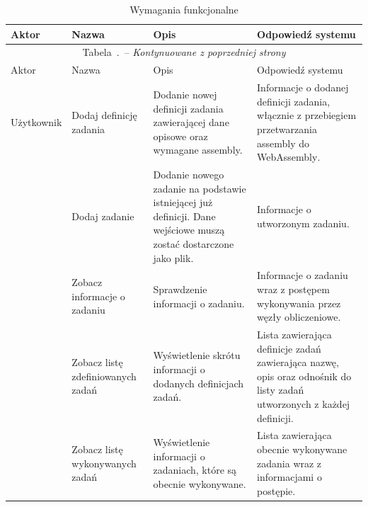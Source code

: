 \documentclass[a4paper,11pt,twoside]{report}
\renewcommand{\tablename}{Tabela}
\renewcommand*{\thetable}{\arabic{chapter}.\arabic{table}}
\theoremstyle{definition}
\begin{document}
            \pagebreak
            \begin{longtable}{| p{} | p{} | p{} | p{} |}
                \caption{Wymagania funkcjonalne}
                \label{wymagania-funkcjonalne} \\
                \hline
                Aktor & Nazwa & Opis & Odpowiedź systemu \\ \hline
                \endfirsthead
                \multicolumn{4}{c}{\tablename\ \thetable\ -- \textit{Kontynuowane z poprzedniej strony}} \\
                \hline
                Aktor & Nazwa & Opis & Odpowiedź systemu \\ \hline
                \endhead
                
                Użytkownik
                & Dodaj definicję zadania
                & Dodanie nowej definicji zadania zawierającej dane opisowe oraz wymagane assembly.
                & Informacje o dodanej definicji zadania, włącznie z przebiegiem przetwarzania assembly do \foreignlanguage{english}{WebAssembly}. \\ \cline{2-4} 
                
                & Dodaj zadanie
                & Dodanie nowego zadanie na podstawie istniejącej już definicji. Dane wejściowe muszą zostać dostarczone jako plik. & Informacje o utworzonym zadaniu. \\ \cline{2-4} 
                
                & Zobacz informacje o zadaniu
                & Sprawdzenie informacji o zadaniu.
                & Informacje o zadaniu wraz z postępem wykonywania przez węzły obliczeniowe. \\ \cline{2-4} 
                & Zobacz listę zdefiniowanych zadań & Wyświetlenie skrótu informacji o dodanych definicjach zadań.                                  & Lista zawierająca definicje zadań zawierająca nazwę, opis oraz odnośnik do listy zadań utworzonych z każdej definicji. \\ \cline{2-4} 
                
                & Zobacz listę wykonywanych zadań   
                & Wyświetlenie informacji o zadaniach, które są obecnie wykonywane.                             
                & Lista zawierająca obecnie wykonywane zadania wraz z informacjami o postępie. \\ \cline{2-4} 
                

\end{longtable}
\end{document}
